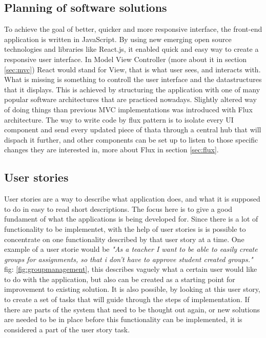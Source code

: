 \subsection{Planning of software solutions}
To achieve the goal of better, quicker and more responsive interface, the front-end application is written in JavaScript. By using new emerging open source technologies and libraries like React.js, it enabled quick and easy way to create a responsive user interface.  In Model View Controller (more about it in section \ref{sec:mvc}) React would stand for View, that is what user sees, and interacts with. What is missing is something to controll the user interface and the datastructures that it displays. This is achieved by structuring the application with one of many popular software architectures that are practiced nowadays. Slightly altered way of doing things than previous MVC implementations was introduced with Flux architecture. The way to write code by flux  pattern is to isolate every UI component and send every updated piece of thata through a central hub that will dispach it further, and other components can be set up to listen to those specific changes they are interested in, more about Flux in section \ref{sec:flux}.
\\
\subsection{User stories}
User stories are a way to describe what application does, and what it is supposed to do in easy to read short descriptions. The focus here is to give a good fundament of what the applications is being developed for. Since there is a lot of functionality to be implementet, with the help of user stories is is possible to concentrate on one functionality described by that user story at a time. One example of a user storie would be \emph{"As a teacher I want to be able to easily create groups for assignments, so that i don't have to approve student created groups."} fig: \ref{fig:groupmanagement},  this describes vaguely what a certain user would like to do with the application, but also can be created as a starting point for improvement to existing solution. It is also possible, by looking at this user story, to create a set of tasks that will guide through the steps of implementation. If there are parts of the system that need to be thought out again, or new solutions are needed to be in place before this functionality can be implemented, it is considered a part of the user story task. 

